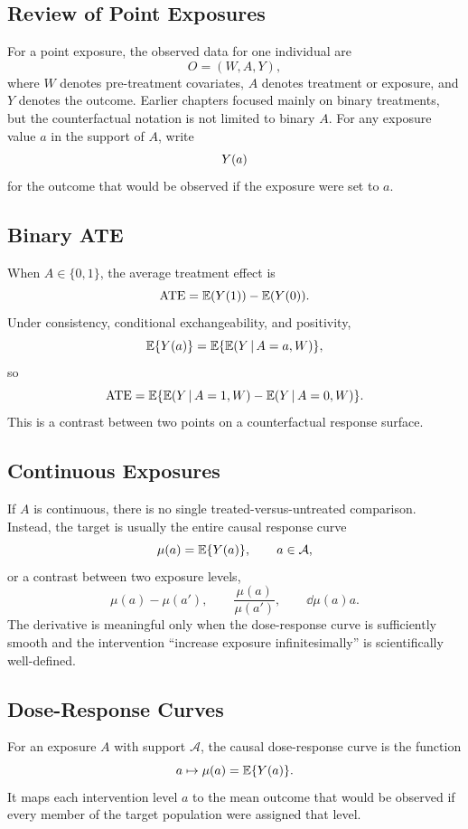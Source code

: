 \label{lec:9-1}

\subsection{Review of Point Exposures}

For a point exposure, the observed data for one individual are
\[
  O=(W,A,Y),
\]
where $W$ denotes pre-treatment covariates, $A$ denotes treatment or exposure,
and $Y$ denotes the outcome. Earlier chapters focused mainly on binary
treatments, but the counterfactual notation is not limited to binary $A$. For
any exposure value $a$ in the support of $A$, write
\[
  Y(a)
\]
for the outcome that would be observed if the exposure were set to $a$.

\subsection{Binary ATE}

When $A\in\{0,1\}$, the average treatment effect is
\[
  \operatorname{ATE}=\mathbb{E}(Y(1))-\mathbb{E}(Y(0)).
\]
Under consistency, conditional exchangeability, and positivity,
\[
  \mathbb{E}\{Y(a)\}=\mathbb{E}\{\mathbb{E}(Y\,\vert\, A=a,W)\},
\]
so
\[
  \operatorname{ATE}
  =
  \mathbb{E}\{\mathbb{E}(Y\,\vert\, A=1,W)-\mathbb{E}(Y\,\vert\, A=0,W)\}.
\]
This is a contrast between two points on a counterfactual response surface.

\subsection{Continuous Exposures}

If $A$ is continuous, there is no single treated-versus-untreated comparison.
Instead, the target is usually the entire causal response curve
\[
  \mu(a)=\mathbb{E}\{Y(a)\},\qquad a\in\mathcal{A},
\]
or a contrast between two exposure levels,
\[
  \mu(a)-\mu(a'),\qquad
  \frac{\mu(a)}{\mu(a')},\qquad
  \dd{\mu(a)}{a}.
\]
The derivative is meaningful only when the dose-response curve is sufficiently
smooth and the intervention ``increase exposure infinitesimally'' is scientifically
well-defined.

\subsection{Dose-Response Curves}

\begin{definition}
For an exposure $A$ with support $\mathcal{A}$, the causal dose-response curve is
the function
\[
  a\mapsto \mu(a)=\mathbb{E}\{Y(a)\}.
\]
It maps each intervention level $a$ to the mean outcome that would be observed
if every member of the target population were assigned that level.
\end{definition}

